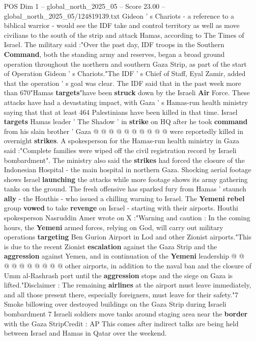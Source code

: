 \begin{textsample}{POS Dim 1 – global\_north\_2025\_05 – Score 23.00 – global\_north\_2025\_05/124819139.txt}  \label{ex:f1_pos_371}
Gideon ' s Chariots - a reference to a biblical warrior - would see the IDF take and control territory as well as move civilians to the south of the strip and attack Hamas, according to The Times of Israel.
The military said :"Over the past day, IDF troops in the Southern \textbf{Command}, both the standing army and reserves, began a broad ground operation throughout the northern and southern Gaza Strip, as part of the start of Operation Gideon ' s Chariots."The IDF ' s Chief of Staff, Eyal Zamir, added that the operation ' s goal was clear.
The IDF said that in the past week more than 670"Hamas \textbf{targets}"have been \textbf{struck} down by the Israeli \textbf{Air} Force.
These attacks have had a devastating impact, with Gaza ' s Hamas-run health ministry saying that that at least 464 Palestinians have been killed in that time.
Israel \textbf{targets} Hamas leader ' The Shadow ' in \textbf{strike} on HQ after he took \textbf{command} from his slain brother ' Gaza @ @ @ @ @ @ @ @ @ @ were reportedly killed in overnight \textbf{strikes}.
A spokesperson for the Hamas-run health ministry in Gaza said :"Complete families were wiped off the civil registration record by Israeli bombardment".
The ministry also said the \textbf{strikes} had forced the closure of the Indonesian Hospital - the main hospital in northern Gaza.
Shocking aerial footage shows Israel \textbf{launching} the attacks while more footage shows its army gathering tanks on the ground.
The fresh offensive has sparked fury from Hamas ' staunch \textbf{ally} - the Houthis - who issued a chilling warning to Israel.
The \textbf{Yemeni} \textbf{rebel} group \textbf{vowed} to take \textbf{revenge} on Israel - starting with their airports.
Houthi spokesperson Nasruddin Amer wrote on X :"Warning and caution : In the coming hours, the \textbf{Yemeni} armed forces, relying on God, will carry out military operations \textbf{targeting} Ben Gurion Airport in Lod and other Zionist airports."This is due to the recent Zionist \textbf{escalation} against the Gaza Strip and the \textbf{aggression} against Yemen, and in continuation of the \textbf{Yemeni} leadership @ @ @ @ @ @ @ @ @ @ other airports, in addition to the naval ban and the closure of Umm al-Rashrash port until the \textbf{aggression} stops and the siege on Gaza is lifted."Disclaimer : The remaining \textbf{airlines} at the airport must leave immediately, and all those present there, especially foreigners, must leave for their safety."7 Smoke billowing over destroyed buildings on the Gaza Strip during Israeli bombardment 7 Israeli soldiers move tanks around staging area near the \textbf{border} with the Gaza StripCredit : AP This comes after indirect talks are being held between Israel and Hamas in Qatar over the weekend.

\end{textsample}

